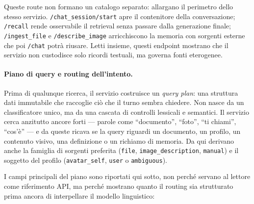 Queste route non formano un catalogo separato: allargano il perimetro dello stesso servizio. \texttt{/chat\_session/start} apre il contenitore della conversazione; \texttt{/recall} rende osservabile il retrieval senza passare dalla generazione finale; \texttt{/ingest\_file} e \texttt{/describe\_image} arricchiscono la memoria con sorgenti esterne che poi \texttt{/chat} potrà riusare. Letti insieme, questi endpoint mostrano che il servizio non custodisce solo ricordi testuali, ma governa fonti eterogenee.

\paragraph{Piano di query e routing dell'intento.}

Prima di qualunque ricerca, il servizio costruisce un \emph{query plan}: una struttura dati immutabile che raccoglie ciò che il turno sembra chiedere. Non nasce da un classificatore unico, ma da una cascata di controlli lessicali e semantici. Il servizio cerca anzitutto ancore forti --- parole come ``documento'', ``foto'', ``ti chiami'', ``cos'è'' --- e da queste ricava se la query riguardi un documento, un profilo, un contenuto visivo, una definizione o un richiamo di memoria. Da qui derivano anche la famiglia di sorgenti preferita (\texttt{file}, \texttt{image\_description}, \texttt{manual}) e il soggetto del profilo (\texttt{avatar\_self}, \texttt{user} o \texttt{ambiguous}).

I campi principali del piano sono riportati qui sotto, non perché servano al lettore come riferimento API, ma perché mostrano quanto il routing sia strutturato prima ancora di interpellare il modello linguistico:


